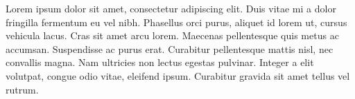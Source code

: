 Lorem ipsum dolor sit amet, consectetur adipiscing elit. Duis vitae mi a
dolor fringilla fermentum eu vel nibh. Phasellus orci purus, aliquet id
lorem ut, cursus vehicula lacus. Cras sit amet arcu lorem. Maecenas
pellentesque quis metus ac accumsan. Suspendisse ac purus erat.
Curabitur pellentesque mattis nisl, nec convallis magna. Nam ultricies
non lectus egestas pulvinar. Integer a elit volutpat, congue odio vitae,
eleifend ipsum. Curabitur gravida sit amet tellus vel rutrum.
